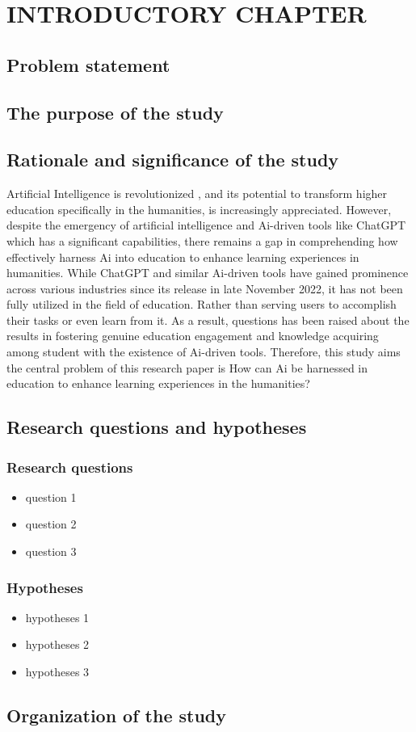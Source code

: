 \chapter{INTRODUCTORY CHAPTER}
\section{Problem statement}
\justifying
\lipsum[1]
\section{The purpose of the study}
\justifying
\lipsum[1]
\section{Rationale and significance of the study}
\justifying
Artificial Intelligence is revolutionized , and its potential
to transform higher education specifically in the humanities, is increasingly
appreciated. However, despite the emergency of artificial intelligence and
Ai-driven tools like ChatGPT which has a significant capabilities,
there remains a gap in comprehending how effectively harness Ai into
education to enhance learning experiences in humanities. While ChatGPT
and similar Ai-driven tools have gained prominence across various
industries since its release in late November 2022, it has not been
fully utilized in the field of education. Rather than serving users
to accomplish their tasks or even learn from it. As a result, questions
has been raised about the results in fostering genuine education engagement
and knowledge acquiring among student with the existence of Ai-driven tools. Therefore, this study aims
the central problem of this research paper is How can Ai be harnessed
in education to enhance learning experiences in the humanities?
\section{Research questions and hypotheses}
\subsection{Research questions}
\justifying
\begin{itemize}
    \item question 1
    \item question 2
    \item question 3
\end{itemize}
\subsection{Hypotheses}
\justifying
\begin{itemize}
    \item hypotheses 1
    \item hypotheses 2
    \item hypotheses 3
\end{itemize}


\section{Organization of the study}
\justifying
\lipsum[1]



